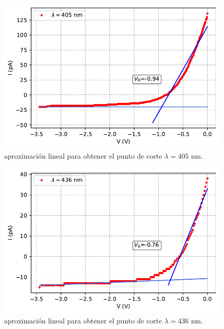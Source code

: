 \documentclass[12pt,a4paper]{article}
\numberwithin{equation}{section}
\numberwithin{table}{section}
\numberwithin{figure}{section}
\begin{document}
\begin{figure}[h!]  \centering
\includegraphics[scale=0.97]{Datos_cortes_2.pdf}
\caption{aproximación lineal para obtener el punto de corte $\lambda=405$ nm.}
\label{Fig:6.1.2}
\end{figure}

\newpage
\begin{figure}[h!]  \centering
\includegraphics[scale=0.97]{Datos_cortes_3.pdf}
\caption{aproximación lineal para obtener el punto de corte $\lambda=436$ nm.}
\label{Fig:6.1.3}
\end{figure}
\end{document}
